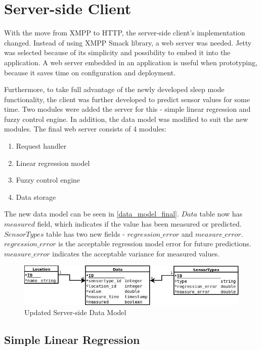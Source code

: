 \section{Server-side Client}

With the move from XMPP to HTTP, the server-side client's implementation changed. Instead of using XMPP Smack library, a web server was needed. Jetty was selected because of its simplicity and possibility to embed it into the application. A web server embedded in an application is useful when prototyping, because it saves time on configuration and deployment. 

Furthermore, to take full advantage of the newly developed sleep mode functionality, the client was further developed to predict sensor values for some time. Two modules were added the server for this - simple linear regression and fuzzy control engine. In addition, the data model was modified to suit the new modules. The final web server consists of 4 modules:

\begin{enumerate}
\item Request handler
\item Linear regression model
\item Fuzzy control engine
\item Data storage
\end{enumerate}

The new data model can be seen in \autoref{data_model_final}. $Data$ table now has $measured$ field, which indicates if the value has been measured or predicted. $SensorTypes$ table has two new fields - $regression\_error$ and $measure\_error$. $regression\_error$ is the acceptable regression model error for future predictions. $measure\_error$ indicates the acceptable variance for measured values. 

\begin{figure}[h!]
\centering
\includegraphics[scale=0.6]{4/figures/data_model_final.jpg}
\caption{Updated Server-side Data Model}
\label{data_model_final}
\end{figure}

\subsection{Simple Linear Regression}

